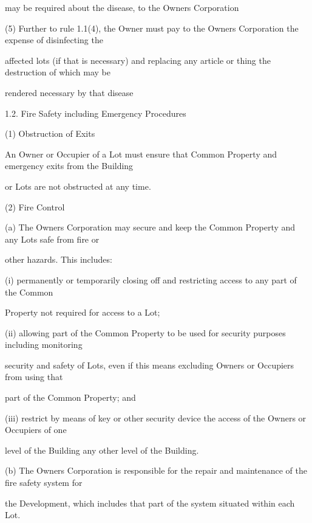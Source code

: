 \documentclass{article}
\begin{document}
{\fontsize{10.02}{1}may be required about the disease, to the Owners Corporation }

{\fontsize{9.962}{1}(5) Further to rule 1.1(4), the Owner must pay to the Owners Corporation the expense of disinfecting the }

{\fontsize{10.02}{1}affected lots (if that is necessary) and replacing any article or thing the destruction of which may be }

{\fontsize{10.02}{1}rendered necessary by that disease }

{\fontsize{9.99}{1}1.2. Fire Safety including Emergency Procedures }

{\fontsize{9.962}{1}(1) Obstruction of Exits }

{\fontsize{10.02}{1}An Owner or Occupier of a Lot must ensure that Common Property and emergency exits from the Building }

{\fontsize{10.02}{1}or Lots are not obstructed at any time. }

{\fontsize{9.962}{1}(2) Fire Control }

{\fontsize{9.962}{1}(a) The Owners Corporation may secure and keep the Common Property and any Lots safe from fire or }

{\fontsize{10.02}{1}other hazards. This includes: }

{\fontsize{9.962}{1}(i) permanently or temporarily closing off and restricting access to any part of the Common }

{\fontsize{10.02}{1}Property not required for access to a Lot; }

{\fontsize{9.962}{1}(ii) allowing part of the Common Property to be used for security purposes including monitoring }

{\fontsize{10.02}{1}security and safety of Lots, even if this means excluding Owners or Occupiers from using that }

{\fontsize{10.02}{1}part of the Common Property; and }

{\fontsize{9.962}{1}(iii) restrict by means of key or other security device the access of the Owners or Occupiers of one }

{\fontsize{10.02}{1}level of the Building any other level of the Building. }

{\fontsize{9.962}{1}(b) The Owners Corporation is responsible for the repair and maintenance of the fire safety system for }

{\fontsize{10.02}{1}the Development, which includes that part of the system situated within each Lot. }
\end{document}
